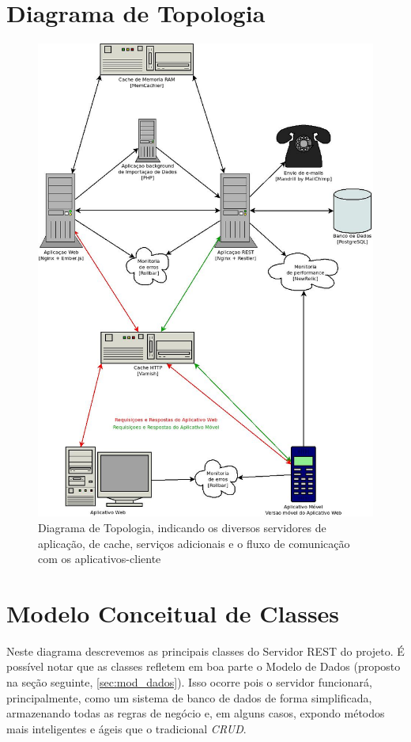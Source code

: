 \documentclass[a4paper]{abnt}
\begin{document}
\section{Diagrama de Topologia}
\begin{figure}[!h]
	\centering
	\includegraphics[scale=0.48]{diagramas/topologia.jpg}
	\caption{Diagrama de Topologia, indicando os diversos servidores de aplicaç\~ao, de cache, serviços adicionais e o fluxo de comunicaç\~ao com os aplicativos-cliente}
\end{figure}

\section{Modelo Conceitual de Classes}
Neste diagrama descrevemos as principais classes do Servidor REST do projeto. É possível notar que as classes refletem em boa parte o Modelo de Dados (proposto na seção seguinte, \ref{sec:mod_dados}). Isso ocorre pois o servidor funcionará, principalmente, como um sistema de banco de dados de forma simplificada, armazenando todas as regras de negócio e, em alguns casos, expondo métodos mais inteligentes e ágeis que o tradicional \emph{CRUD}. 
\end{document}
